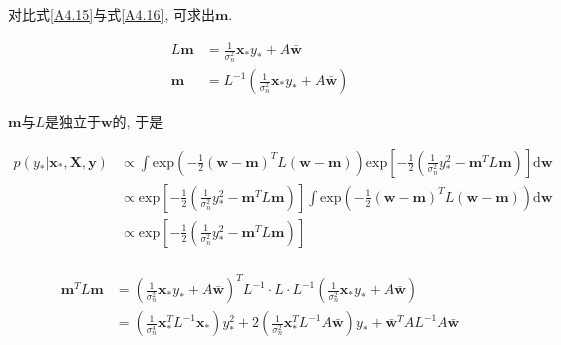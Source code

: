         对比式\ref{A4.15}与式\ref{A4.16}, 可求出$\boldsymbol{m}$.

        \begin{equation}\label{A4.17}
            \begin{aligned}
                L\boldsymbol{m}&=\frac{1}{\sigma^{2}_{n}}\boldsymbol{x}_{*}y_{*}+A\boldsymbol{\bar{w}} \\
                \boldsymbol{m}&=L^{-1}(\frac{1}{\sigma^{2}_{n}}\boldsymbol{x}_{*}y_{*}+A\boldsymbol{\bar{w}})
            \end{aligned}
        \end{equation}

        $\boldsymbol{m}$与$L$是独立于$\boldsymbol{w}$的, 于是

        \begin{equation}
            \begin{aligned}\label{A4.18}
                p(y_{*}|\boldsymbol{x}_{*},\boldsymbol{X},\boldsymbol{y})
                &\propto\int\mathrm{exp}\left( -\frac{1}{2}(\boldsymbol{w}-\boldsymbol{m})^{T}L(\boldsymbol{w}-\boldsymbol{m}) \right) \mathrm{exp}\left[ -\frac{1}{2}(\frac{1}{\sigma^{2}_{n}}y^{2}_{*} - \boldsymbol{m}^{T}L\boldsymbol{m}) \right]  \mathrm{d}\boldsymbol{w} \\
                &\propto\mathrm{exp}\left[ -\frac{1}{2}\left(\frac{1}{\sigma^{2}_{n}}y^{2}_{*} - \boldsymbol{m}^{T}L\boldsymbol{m}\right) \right]\int\mathrm{exp}\left( -\frac{1}{2}(\boldsymbol{w}-\boldsymbol{m})^{T}L(\boldsymbol{w}-\boldsymbol{m}) \right) \mathrm{d}\boldsymbol{w} \\
                &\propto\mathrm{exp}\left[ -\frac{1}{2}\left(\frac{1}{\sigma^{2}_{n}}y^{2}_{*} - \boldsymbol{m}^{T}L\boldsymbol{m}\right) \right]\\
            \end{aligned}
        \end{equation}

        \begin{equation}
            \begin{aligned}\label{A4.19}
                \boldsymbol{m}^{T}L\boldsymbol{m}
                &=\left(\frac{1}{\sigma^{2}_{n}}\boldsymbol{x}_{*}y_{*}+A\boldsymbol{\bar{w}}\right)^{T}L^{-1}\cdot L\cdot L^{-1}\left(\frac{1}{\sigma^{2}_{n}}\boldsymbol{x}_{*}y_{*}+A\boldsymbol{\bar{w}}\right) \\
                &=\left( \frac{1}{\sigma^{4}_{n}}\boldsymbol{x}^{T}_{*}L^{-1}\boldsymbol{x}_{*} \right)y^{2}_{*} + 2\left( \frac{1}{\sigma^{2}_{n}}\boldsymbol{x}^{T}_{*}L^{-1}A\boldsymbol{\bar{w}}\right)y_{*}+\boldsymbol{\bar{w}}^{T}AL^{-1}A\boldsymbol{\bar{w}} \\
            \end{aligned}
        \end{equation}

